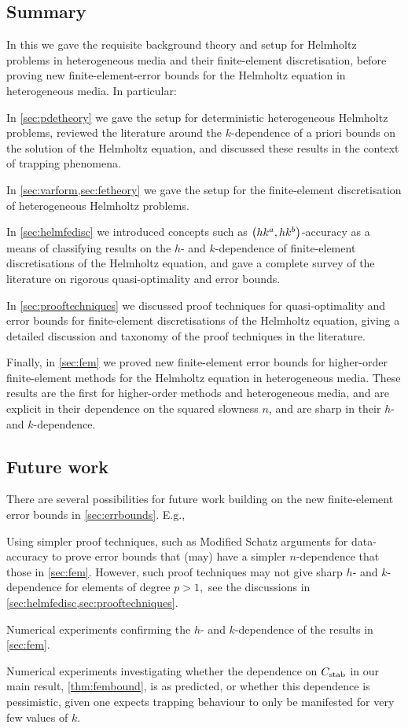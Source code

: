 \subsection{Summary}
In this  we gave the requisite background theory and setup for Helmholtz problems in heterogeneous media and their finite-element discretisation, before proving new finite-element-error bounds for the Helmholtz equation in heterogeneous media. In particular:

\bit
\item In \cref{sec:pdetheory} we gave the setup for deterministic heterogeneous Helmholtz problems, reviewed the literature around the $k$-dependence of a priori bounds on the solution of the Helmholtz equation, and discussed these results in the context of trapping phenomena.
\item In \cref{sec:varform,sec:fetheory} we gave the setup for the finite-element discretisation of heterogeneous Helmholtz problems.
\item In \cref{sec:helmfedisc} we introduced concepts such as $\hk{a}{b}$-accuracy as a means of classifying results on the $h$- and $k$-dependence of finite-element discretisations of the Helmholtz equation, and gave a complete survey of the literature on rigorous quasi-optimality and error bounds.
\item In \cref{sec:prooftechniques} we discussed proof techniques for quasi-optimality and error bounds for finite-element discretisations of the Helmholtz equation, giving a detailed discussion and taxonomy of the proof techniques in the literature.
\item Finally, in \cref{sec:fem} we proved new finite-element error bounds for higher-order finite-element methods for the Helmholtz equation in heterogeneous media. These results are the first for higher-order methods and heterogeneous media, and are explicit in their dependence on the squared slowness $n$, and are sharp in their $h$- and $k$-dependence.
  \eit
  
\subsection{Future work}
There are several possibilities for future work building on the new finite-element error bounds in \cref{sec:errbounds}. E.g.,
\bit
\item Using simpler proof techniques, such as Modified Schatz arguments for data-accuracy to prove error bounds that (may) have a simpler $n$-dependence that those in \cref{sec:fem}. However, such proof techniques may not give sharp $h$- and $k$-dependence for elements of degree $p > 1,$ see the discussions in \cref{sec:helmfedisc,sec:prooftechniques}.
\item Numerical experiments confirming the $h$- and $k$-dependence of the results in \cref{sec:fem}.
  \item Numerical experiments investigating whether the dependence on $C_{\mathrm{stab}}$ in our main result, \cref{thm:fembound}, is as predicted, or whether this dependence is pessimistic, given one expects trapping behaviour to only be manifested for very few values of $k.$
\eit
